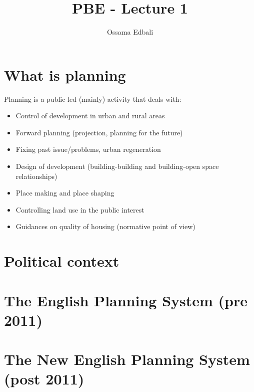 \documentclass{article}
\title{PBE - Lecture 1}
\author{Ossama Edbali}
\begin{document}
	
	\maketitle	
	
	\section{What is planning}
	Planning is a public-led (mainly) activity that deals with:
	\begin{itemize}
		\item Control of development in urban and rural areas
		\item Forward planning (projection, planning for the future)
		\item Fixing past issue/problems, urban regeneration
		\item Design of development (building-building and building-open space relationships)
		\item Place making and place shaping
		\item Controlling land use in the public interest
		\item Guidances on quality of housing (normative point of view)
	\end{itemize}
	
	\section{Political context}
	
	\section{The English Planning System (pre 2011)}
	
	\section{The New English Planning System (post 2011)}	
	
\end{document}
